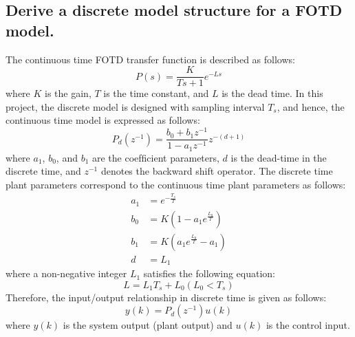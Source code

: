 \documentclass[11pt]{scrartcl} %
\begin{document}
\subsection{Derive a discrete model structure for a FOTD model.}
The continuous time FOTD transfer function is described as follows:
\begin{equation}P(s)=\frac{K}{T s+1} e^{-L s}\end{equation}
where $K$ is the gain, $T$ is the time constant, and $L$ is the dead time. In this project, the discrete model is designed with sampling interval $T_s$, and hence, the continuous time model is expressed as follows:
\begin{equation}P_{d}\left(z^{-1}\right)=\frac{b_{0}+b_{1} z^{-1}}{1-a_{1} z^{-1}} z^{-(d+1)}\end{equation}
where $a_1$, $b_0$, and $b_1$ are the coefﬁcient parameters, $d$ is the dead-time in the discrete time, and $z^{-1}$ denotes the backward shift operator. The discrete time plant parameters correspond to the continuous time plant parameters as follows:
\begin{equation}\begin{aligned}
a_{1} &=e^{-\frac{T_{s}}{T}} \\
b_{0} &=K\left(1-a_{1} e^{\frac{L_{0}}{T}}\right) \\
b_{1} &=K\left(a_{1} e^{\frac{L_{0}}{T}}-a_{1}\right) \\
d &=L_{1}
\end{aligned}\end{equation}
where a non-negative integer $L_1$ satisﬁes the following equation:
\begin{equation}L=L_{1} T_{s}+L_{0}\left(L_{0}<T_{s}\right)\end{equation}
Therefore, the input/output relationship in discrete time is given as follows:
\begin{equation}y(k)=P_{d}\left(z^{-1}\right) u(k)\end{equation}
where $y(k)$ is the system output (plant output) and $u(k)$ is the control input.
\end{document}
